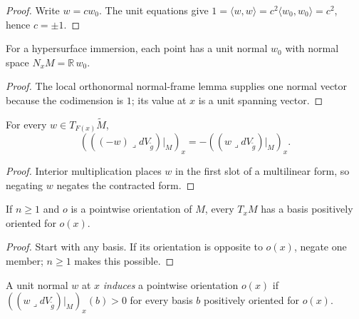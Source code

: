 \begin{proof}
\leanok
{}
\sketch Write $w=cw_0$. The unit equations give $1=\langle w,w\rangle=c^2\langle w_0,w_0\rangle=c^2$, hence $c=\pm1$.
\end{proof}

\begin{lemma}
\label{lem:pointwise-unit-normal-span}
\leanok
{}
For a hypersurface immersion, each point has a unit normal $w_0$ with normal space $N_xM=\mathbb R\,w_0$.
\end{lemma}

\begin{proof}
\leanok
{}
\sketch The local orthonormal normal-frame lemma supplies one normal vector because the codimension is $1$; its value at $x$ is a unit spanning vector.
\end{proof}

\begin{lemma}
\label{lem:normal-restrict-neg-normal}
\leanok
{}
For every $w\in T_{F(x)}\widetilde M$,
\[
(((-w)\lrcorner dV_{\widetilde g})|_M)_x=-((w\lrcorner dV_{\widetilde g})|_M)_x.
\]
\end{lemma}

\begin{proof}
\leanok
\sketch Interior multiplication places $w$ in the first slot of a multilinear form, so negating $w$ negates the contracted form.
\end{proof}

\begin{lemma}
\label{lem:basis-realizing-orientation}
\leanok
{}
If $n\ge1$ and $o$ is a pointwise orientation of $M$, every $T_xM$ has a basis positively oriented for $o(x)$.
\end{lemma}

\begin{proof}
\leanok
\sketch Start with any basis. If its orientation is opposite to $o(x)$, negate one member; $n\ge1$ makes this possible.
\end{proof}

\begin{definition}
\label{def:oriented-unit-normal}
\leanok
{}
A unit normal $w$ at $x$ \emph{induces} a pointwise orientation $o(x)$ if $((w\lrcorner dV_{\widetilde g})|_M)_x(b)>0$ for every basis $b$ positively oriented for $o(x)$.
\end{definition}

